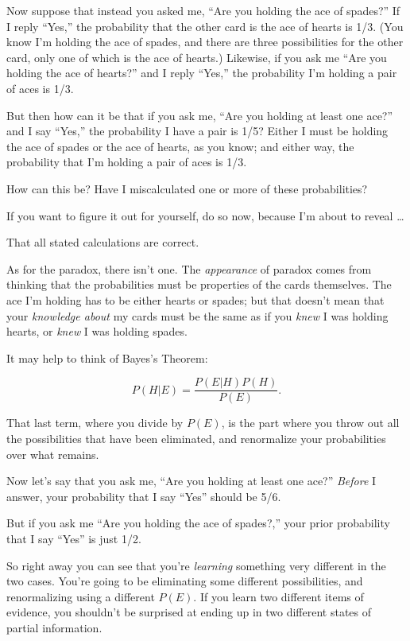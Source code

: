 {
 Now suppose that instead you asked me, ``Are you
holding the ace of spades?'' If I reply
``Yes,'' the probability that the
other card is the ace of hearts is 1/3. (You know I'm
holding the ace of spades, and there are three possibilities for the
other card, only one of which is the ace of hearts.) Likewise, if you
ask me ``Are you holding the ace of
hearts?'' and I reply
``Yes,'' the probability
I'm holding a pair of aces is 1/3.}

{
 But then how can it be that if you ask me, ``Are
you holding at least one ace?'' and I say
``Yes,'' the probability I have a
pair is 1/5? Either I must be holding the ace of spades or the ace of
hearts, as you know; and either way, the probability that
I'm holding a pair of aces is 1/3.}

{
 How can this be? Have I miscalculated one or more of these
probabilities?}

{
 If you want to figure it out for yourself, do so now, because
I'm about to reveal \ldots}

{
 That all stated calculations are correct.}

{
 As for the paradox, there isn't one. The
\textit{appearance} of paradox comes from thinking that the
probabilities must be properties of the cards themselves. The ace
I'm holding has to be either hearts or spades; but that
doesn't mean that your \textit{knowledge about} my
cards must be the same as if you \textit{knew} I was holding hearts, or
\textit{knew} I was holding spades.}

{
 It may help to think of Bayes's Theorem:}

\begin{equation*}
  P(H|E) = \frac{P(E|H)P(H)}{P(E)}.
\end{equation*}


{
 That last term, where you divide by $P(E)$, is the part where you
throw out all the possibilities that have been eliminated, and
renormalize your probabilities over what remains. }

{
 Now let's say that you ask me,
``Are you holding at least one
ace?'' \textit{Before} I answer, your probability
that I say ``Yes'' should be 5/6.}

{
 But if you ask me ``Are you holding the ace of
spades?,'' your prior probability that I say
``Yes'' is just 1/2.}

{
 So right away you can see that you're
\textit{learning} something very different in the two cases.
You're going to be eliminating some different
possibilities, and renormalizing using a different $P(E)$. If you learn
two different items of evidence, you shouldn't be
surprised at ending up in two different states of partial information.}

